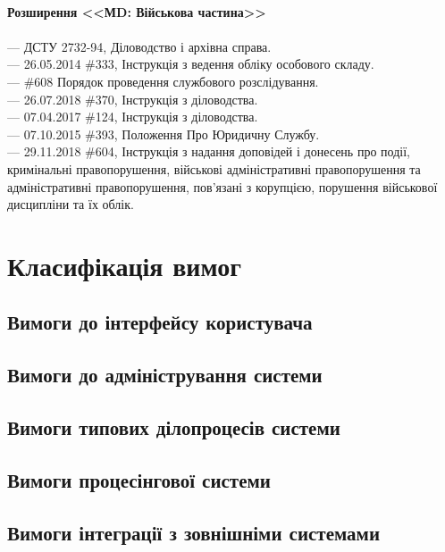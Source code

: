 \\
\newpage
{\bf Розширення <<МD: Військова частина>>}
\\
\\
--- {ДСТУ 2732-94}, Діловодство і архівна справа. \\
--- {26.05.2014 \#333}, Інструкція з ведення обліку особового складу. \\
--- {\#608} Порядок проведення службового розслідування. \\
--- {26.07.2018 \#370}, Інструкція з діловодства. \\
--- {07.04.2017 \#124}, Інструкція з діловодства. \\
--- {07.10.2015 \#393}, Положення Про Юридичну Службу. \\
--- {29.11.2018 \#604}, Інструкція з надання доповідей і донесень про події,
                кримінальні правопорушення, військові адміністративні
                правопорушення та адміністративні правопорушення,
                пов'язані з корупцією, порушення військової дисципліни та їх облік. \\

\newpage
\section{Класифікація вимог}

\subsection{Вимоги до інтерфейсу користувача}

\subsection{Вимоги до адміністрування системи}

\subsection{Вимоги типових ділопроцесів системи}

\subsection{Вимоги процесінгової системи}

\subsection{Вимоги інтеграції з зовнішніми системами}

